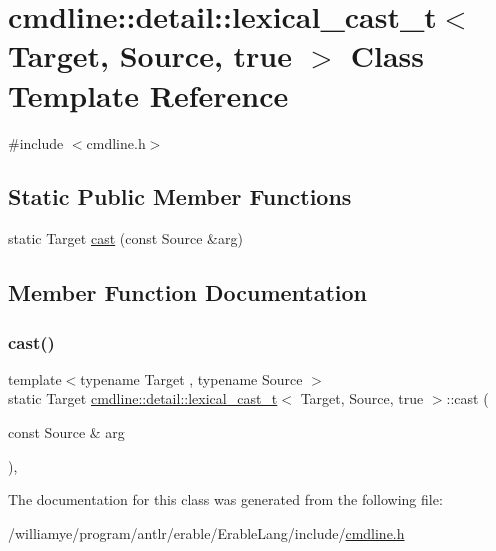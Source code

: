 \hypertarget{classcmdline_1_1detail_1_1lexical__cast__t_3_01_target_00_01_source_00_01true_01_4}{}\section{cmdline\+::detail\+::lexical\+\_\+cast\+\_\+t$<$ Target, Source, true $>$ Class Template Reference}
\label{classcmdline_1_1detail_1_1lexical__cast__t_3_01_target_00_01_source_00_01true_01_4}


{\ttfamily \#include $<$cmdline.\+h$>$}

\subsection*{Static Public Member Functions}
\begin{DoxyCompactItemize}
\item 
static Target \mbox{\hyperlink{classcmdline_1_1detail_1_1lexical__cast__t_3_01_target_00_01_source_00_01true_01_4_a424e3e47b97dde835cdcc3d290618fc5}{cast}} (const Source \&arg)
\end{DoxyCompactItemize}


\subsection{Member Function Documentation}
\mbox{\label{classcmdline_1_1detail_1_1lexical__cast__t_3_01_target_00_01_source_00_01true_01_4_a424e3e47b97dde835cdcc3d290618fc5}} 
\subsubsection{\texorpdfstring{cast()}{cast()}}
{\footnotesize\ttfamily template$<$typename Target , typename Source $>$ \\
static Target \mbox{\hyperlink{classcmdline_1_1detail_1_1lexical__cast__t}{cmdline\+::detail\+::lexical\+\_\+cast\+\_\+t}}$<$ Target, Source, true $>$\+::cast (\begin{DoxyParamCaption}\item[{const Source \&}]{arg }\end{DoxyParamCaption})\hspace{0.3cm}{\ttfamily [inline]}, {\ttfamily [static]}}



The documentation for this class was generated from the following file\+:\begin{DoxyCompactItemize}
\item 
/williamye/program/antlr/erable/\+Erable\+Lang/include/\mbox{\hyperlink{cmdline_8h}{cmdline.\+h}}\end{DoxyCompactItemize}
